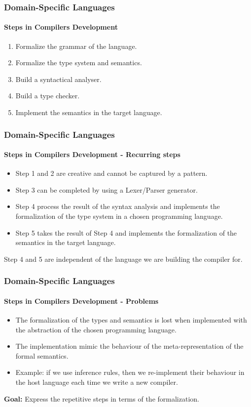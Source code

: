 \documentclass[10pt,a4paper]{beamer}
\begin{document}
\begin{frame}
\frametitle{Domain-Specific Languages}
\framesubtitle{Steps in Compilers Development}
\begin{enumerate}
	\item Formalize the grammar of the language.
	\item Formalize the type system and semantics.
	\item Build a syntactical analyser.
	\item Build a type checker.
	\item Implement the semantics in the target language.
\end{enumerate}
\end{frame}

\begin{frame}
\frametitle{Domain-Specific Languages}
\framesubtitle{Steps in Compilers Development - Recurring steps}
\begin{itemize}
	\item Step 1 and 2 are creative and cannot be captured by a pattern.
	\item Step 3 can be completed by using a Lexer/Parser generator.
	\item Step 4 process the result of the syntax analysis and implements the formalization of the type system in a chosen programming language.
	\item Step 5 takes the result of Step 4 and implements the formalization of the semantics in the target language.
\end{itemize}

Step 4 and 5 are independent of the language we are building the compiler for.
\end{frame}

\begin{frame}
\frametitle{Domain-Specific Languages}
\framesubtitle{Steps in Compilers Development - Problems}
\begin{itemize}
	\item The formalization of the types and semantics is lost when implemented with the abstraction of the chosen programming language.
	\item The implementation mimic the behaviour of the meta-representation of the formal semantics.
	\item Example: if we use inference rules, then we re-implement their behaviour in the host language each time we write a new compiler.
\end{itemize}

\textbf{Goal:} Express the repetitive steps in terms of the formalization.
\end{frame}
\end{document}
